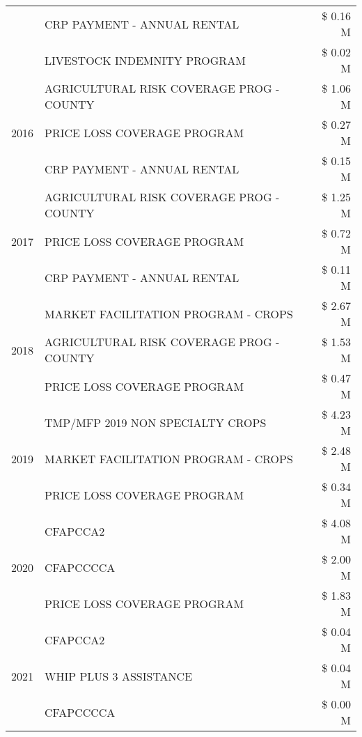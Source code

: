 \begin{tabular}{llr}
 & CRP PAYMENT - ANNUAL RENTAL & \$ 0.16 M \\
 & LIVESTOCK INDEMNITY PROGRAM & \$ 0.02 M \\
\cline{1-3}
\multirow[t]{3}{*}{2016} & AGRICULTURAL RISK COVERAGE PROG - COUNTY & \$ 1.06 M \\
 & PRICE LOSS COVERAGE PROGRAM & \$ 0.27 M \\
 & CRP PAYMENT - ANNUAL RENTAL & \$ 0.15 M \\
\cline{1-3}
\multirow[t]{3}{*}{2017} & AGRICULTURAL RISK COVERAGE PROG - COUNTY & \$ 1.25 M \\
 & PRICE LOSS COVERAGE PROGRAM & \$ 0.72 M \\
 & CRP PAYMENT - ANNUAL RENTAL & \$ 0.11 M \\
\cline{1-3}
\multirow[t]{3}{*}{2018} & MARKET FACILITATION PROGRAM - CROPS & \$ 2.67 M \\
 & AGRICULTURAL RISK COVERAGE PROG - COUNTY & \$ 1.53 M \\
 & PRICE LOSS COVERAGE PROGRAM & \$ 0.47 M \\
\cline{1-3}
\multirow[t]{3}{*}{2019} & TMP/MFP 2019 NON SPECIALTY CROPS & \$ 4.23 M \\
 & MARKET FACILITATION PROGRAM - CROPS & \$ 2.48 M \\
 & PRICE LOSS COVERAGE PROGRAM & \$ 0.34 M \\
\cline{1-3}
\multirow[t]{3}{*}{2020} & CFAPCCA2 & \$ 4.08 M \\
 & CFAPCCCCA & \$ 2.00 M \\
 & PRICE LOSS COVERAGE PROGRAM & \$ 1.83 M \\
\cline{1-3}
\multirow[t]{3}{*}{2021} & CFAPCCA2 & \$ 0.04 M \\
 & WHIP PLUS 3 ASSISTANCE & \$ 0.04 M \\
 & CFAPCCCCA & \$ 0.00 M \\
\cline{1-3}
\bottomrule
\end{tabular}
